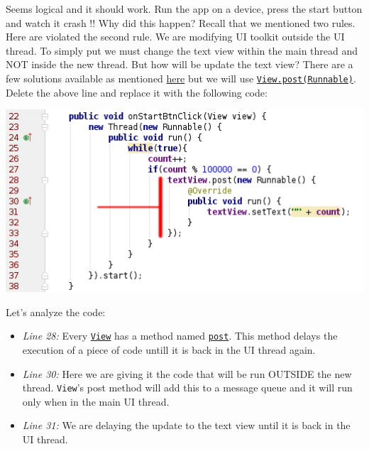 Seems logical and it should work. Run the app on a device, press the start button and watch it crash !! Why did this happen? Recall that we mentioned two rules. Here are violated the second rule. We are modifying UI toolkit outside the UI thread. To simply put we must change the text view within the main thread and NOT inside the new thread. But how will be update the text view? There are a few solutions available as mentioned \href{https://developer.android.com/guide/components/processes-and-threads.html#WorkerThreads}{here} but we will use \href{https://developer.android.com/reference/android/view/View.html#post(java.lang.Runnable)}{\texttt{View.post(Runnable)}}. Delete the above line and replace it with the following code:

\begin{center}
	\includegraphics[scale=\SourceCodeScale]{chapters/ch14/images/21}
\end{center}

Let's analyze the code:

\begin{itemize}
	\item \textit{Line 28:} Every \href{https://developer.android.com/reference/android/view/View.html}{\texttt{View}} has a method named \href{https://developer.android.com/reference/android/view/View.html#post(java.lang.Runnable)}{\texttt{post}}. This method delays the execution of a piece of code untill it is back in the UI thread again. 
	
	\item \textit{Line 30:} Here we are giving it the code that will be run OUTSIDE the new thread. \texttt{View}'s post method will add this to a message queue and it will run only when in the main UI thread.
	
	\item \textit{Line 31:} We are delaying the update to the text view until it is back in the UI thread.
	
\end{itemize}


